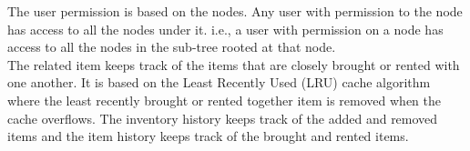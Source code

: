 The user permission is based on the nodes. Any user with permission to the node has access to all the nodes under it. i.e., a user with permission on a node has access to all the nodes in the sub-tree rooted at that node. \\

The related item keeps track of the items that are closely brought or rented with one another. It is based on the Least Recently Used (LRU) cache algorithm where the least recently brought or rented together item is removed when the cache overflows.
The inventory history keeps track of the added and removed items and the item history keeps track of the brought and rented items.